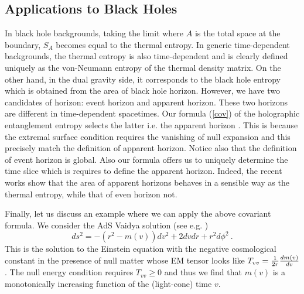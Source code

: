 \documentclass[12pt]{article}
\def\frac#1#2{{#1\over #2}}
\def\frac#1#2{{#1\over #2}}
\begin{document}
\subsection{Applications to Black Holes}
\hspace{5mm}
In black hole backgrounds, taking the limit where $A$ is the total space at the boundary, $S_A$ becomes
equal to the thermal entropy. In generic time-dependent backgrounds,
the thermal entropy is also time-dependent
and is clearly defined uniquely as the von-Neumann entropy of the thermal density matrix.
On the other hand, in the dual gravity side, it corresponds to the black hole entropy
which is obtained from the area of black hole horizon. However,
we have two candidates of horizon: event horizon
and apparent horizon. These two horizons are different in time-dependent spacetimes.
Our formula (\ref{cov}) of the holographic entanglement entropy selects the latter i.e.
the apparent horizon \cite{Hubeny:2007xt}. This is because the extremal surface condition
requires the vanishing of null expansion and this precisely match the definition of
apparent horizon. Notice also that the definition of event horizon is global.
Also our formula offers us to uniquely determine the
time slice which is requires to define the apparent horizon. Indeed, the recent works
\cite{ChYa,Figueras:2009iu} show that the area of apparent horizons behaves in a sensible way
as the thermal entropy, while that of even horizon not.

Finally, let us discuss an example where we can apply the
above covariant formula. We consider the AdS Vaidya solution (see e.g. \cite{Hub})
\begin{equation}\label{va}
ds^2=-(r^2-m(v))dv^2+2dvdr+r^2d\phi^2\ .
\end{equation}
This is the solution to the Einstein equation with the negative
cosmological constant in the presence of null matter whose EM tensor
looks like $T_{vv}=\frac{1}{2r}\frac{dm(v)}{dv}$. The null energy
condition requires $T_{vv}\geq 0$ and thus we find that $m(v)$ is a
monotonically increasing function of the (light-cone) time $v$.
\end{document}
